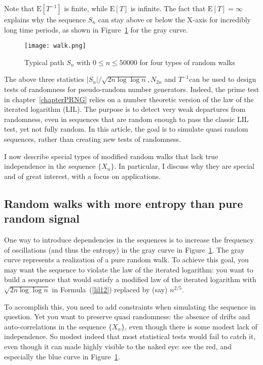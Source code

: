 \documentclass[oneside,10pt]{book}
\begin{document}
\noindent Note that $\text{E}[T^{-1}]$ is finite, while $\text{E}[T]$ is infinite. The fact that
 $\text{E}[T]=\infty$ explains why the sequence $S_n$ can stay above or below the X-axis for incredibly long time periods, as shown
 in Figure~\ref{fig:walk} for the gray curve.

\begin{figure}%
\centering
\texttt{[image: walk.png]}
\caption{Typical path $S_n$ with $0\leq n\leq \num{50000}$ for four types of random walks}
\label{fig:walk}
\end{figure}

The above three statistics $|S_n|/\sqrt{2n\log\log n}, N_{2n}$ and $T^{-1}$can be used to design tests of randomness for pseudo-random number generators. Indeed, the \textcolor{index}{prime test} in chapter~\ref{chapterPRNG}  relies on a number theoretic version of the law of the iterated logarithm (LIL). The purpose is to detect very weak departures from randomness, even in sequences that are random enough to pass the classic LIL test, yet not fully random. In this article, the goal is to
 simulate quasi random sequences, rather than creating new tests of randomness.

I now describe special types of modified random walks that lack true independence in the sequence $\{X_n\}$. In particular, I discuss why
 they are special and of great interest, with a focus on applications.


\subsection{Random walks with more entropy than pure random signal}\label{azxa}

One way to introduce dependencies in the sequences is to increase the frequency of oscillations (and thus the entropy) in the gray curve in
 Figure~\ref{fig:walk}. The gray curve represents a realization of a pure random walk.
 To achieve this goal, you may want the sequence to violate the law of the iterated logarithm: you want to build a sequence that would satisfy a modified law of the iterated logarithm with $\sqrt{2n\log\log n}$ in Formula~(\ref{lil12}) replaced by (say) $n^{2/5}$.

To accomplish this, you need to add constraints when simulating the sequence in question.  Yet you want to preserve quasi randomness:
the absence of drifts and auto-correlations in
 the sequence $\{X_n\}$, even though there is some modest lack of independence. So modest indeed that most statistical tests would fail to catch it, even though it can made highly visible to the naked eye: see the red, and especially the blue curve in Figure~\ref{fig:walk}.
\end{document}
